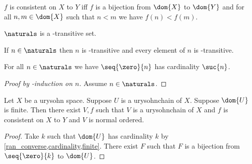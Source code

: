 \begin{definition}\label{bijection_of_urysohnchains}
    $f$ is consistent on $X$ to $Y$ iff $f$ is a bijection from $\dom{X}$ to $\dom{Y}$ and for all $n,m \in \dom{X}$ such that $n < m$ we have $f(n) < f(m)$.
\end{definition}

\begin{proposition}\label{naturals_in_transitive}
    $\naturals$ is a \in-transitive set.
\end{proposition}

\begin{proposition}\label{naturals_elem_in_transitive}
    If $n \in \naturals$ then $n$ is \in-transitive and every element of $n$ is \in-transitive. 
    
\end{proposition}

\begin{proposition}\label{seq_zero_to_n_isomorph_to_n}
    For all $n \in \naturals$ we have $\seq{\zero}{n}$ has cardinality $\suc{n}$.
\end{proposition}
\begin{proof} [Proof by \in-induction on $n$]
    Assume $n \in \naturals$.
\end{proof}

\begin{proposition}\label{existence_normal_ordered_urysohn}
    Let $X$ be a urysohn space.
    Suppose $U$ is a urysohnchain of $X$.
    Suppose $\dom{U}$ is finite.
    Then there exist $V,f$ such that $V$ is a urysohnchain of $X$ and $f$ is consistent on $X$ to $Y$ and $V$ is normal ordered.
\end{proposition}
\begin{proof}
    Take $k$ such that $\dom{U}$ has cardinality $k$ by \cref{ran_converse,cardinality,finite}.
    There exist $F$ such that $F$ is a bijection from $\seq{\zero}{k}$ to $\dom{U}$.


\end{proof}


